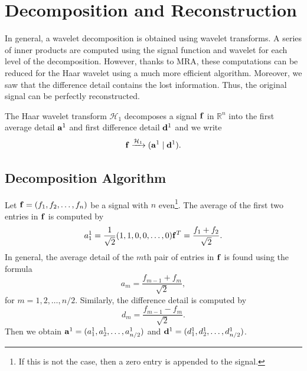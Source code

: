 \documentclass[12pt]{article}
\def\RR{\mathbb{R}}
\theoremstyle{definition}
\begin{document}
  \section{Decomposition and Reconstruction}

  In general, a wavelet decomposition is obtained using wavelet transforms. A series of inner products are computed using the signal function and wavelet for each level of the decomposition. However, thanks to MRA, these computations can be reduced for the Haar wavelet using a much more efficient algorithm. Moreover, we saw that the difference detail contains the lost information. Thus, the original signal can be perfectly reconstructed.

  The Haar wavelet transform \(\mathcal{H}_1\) decomposes a signal \(\vb{f}\) in \(\RR^n\) into the first average detail \(\vb{a}^1\) and first difference detail \(\vb{d}^1\) and we write
  \begin{equation}
    \vb{f} \xrightarrow{\mathcal{H}_1} (\vb{a}^1 \mid \vb{d}^1).
  \end{equation}

  \subsection{Decomposition Algorithm}

  Let \(\vb{f} = (f_1, f_2, \dots, f_n)\) be a signal with \(n\) even\footnote{If this is not the case, then a zero entry is appended to the signal.}. The average of the first two entries in \(\vb{f}\) is computed by
  \[a_1^1 = \frac{1}{\sqrt{2}} (1,1,0,0,\dots,0) \vb{f}^T = \frac{f_1 + f_2}{\sqrt{2}}.\]
  In general, the average detail of the \(m\)th pair of entries in \(\vb{f}\) is found using the formula
  \begin{equation} \label{eqn:avg-detail}
    a_m = \frac{f_{m-1} + f_{m}}{\sqrt{2}},
  \end{equation}
  for \(m = 1, 2, \dots, n/2\). Similarly, the difference detail is computed by
  \begin{equation} \label{eqn:diff-detail}
    d_m = \frac{f_{m-1} - f_{m}}{\sqrt{2}}.
  \end{equation}
  Then we obtain \(\vb{a}^1 = (a_1^1, a_2^1, \dots, a_{n/2}^1)\) and \(\vb{d}^1 = (d_1^1, d_2^1, \dots, d_{n/2}^1)\).
\end{document}
